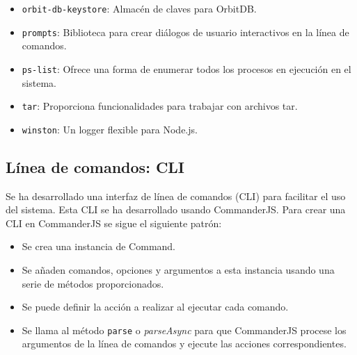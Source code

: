 \begin{itemize}[noitemsep,after=\vspace{-0.4\baselineskip}]
\begin{itemize}[noitemsep]
          \item \texttt{orbit-db-keystore}: Almacén de claves para OrbitDB.
          \item \texttt{prompts}: Biblioteca para crear diálogos de usuario interactivos en la línea de comandos.
          \item \texttt{ps-list}: Ofrece una forma de enumerar todos los procesos en ejecución en el sistema.
          \item \texttt{tar}: Proporciona funcionalidades para trabajar con archivos tar.
          \item \texttt{winston}: Un logger flexible para Node.js.
        \end{itemize}

\end{itemize}

\subsection{Línea de comandos: CLI}\label{sssect:cli}
Se ha desarrollado una interfaz de línea de comandos (CLI) para facilitar el uso del sistema. Esta CLI se ha desarrollado usando CommanderJS.
Para crear una CLI en CommanderJS se sigue el siguiente patrón:
\begin{itemize}[noitemsep,after=\vspace{-0.4\baselineskip}]
  \item Se crea una instancia de Command.
  \item Se añaden comandos, opciones y argumentos a esta instancia usando una serie de métodos proporcionados.
  \item Se puede definir la acción a realizar al ejecutar cada comando.
  \item Se llama al método \texttt{parse} o \textit{parseAsync} para que CommanderJS procese los argumentos de la línea de comandos y ejecute las acciones correspondientes.
\end{itemize}

